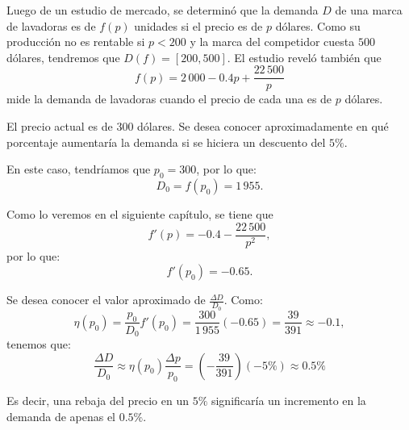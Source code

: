 \begin{exemplo}[]{}
Luego de un estudio de mercado, se determinó que la demanda $D$ de una marca de lavadoras es de
$f(p)$ unidades si el precio es de $p$ dólares. Como su producción no es rentable si $p < 200$ y la
marca del competidor cuesta $500$ dólares, tendremos que $D(f) = [200,500]$. El estudio reveló
también que
\[
 f(p) = 2\,000 - 0.4p + \frac{22\,500}{p}
\]
mide la demanda de lavadoras cuando el precio de cada una es de $p$ dólares.

El precio actual es de $300$ dólares. Se desea conocer aproximadamente en qué porcentaje aumentaría
la demanda si se hiciera un descuento del $5\%$.

En este caso, tendríamos que $p_{0} = 300$, por lo que:
\[
 D_{0} = f(p_{0}) = 1\,955.
\]

Como lo veremos en el siguiente capítulo, se tiene que
\[
 f'(p) = -0.4 - \frac{22\,500}{p^{2}},
\]
por lo que:
\[
f'(p_{0}) = - 0.65.
\]

Se desea conocer el valor aproximado de $\frac{\Delta D}{D_{0}}$. Como:
\[
 \eta (p_{0}) = \frac{p_{0}}{D_{0}} f'(p_{0}) = \frac{300}{1\,955}(-0.65) =
 \frac{39}{391}\approx -0.1,
\]
tenemos que:
\[
\frac{\Delta D}{D_{0}}\approx \eta (p_{0})\frac{\Delta p}{p_{0}} =
\left(-\frac{39}{391}\right)(-5\%)\approx 0.5\%
\]

Es decir, una rebaja del precio en un $5\%$ significaría un incremento en la demanda de apenas el
$0.5\%$.
\end{exemplo}

